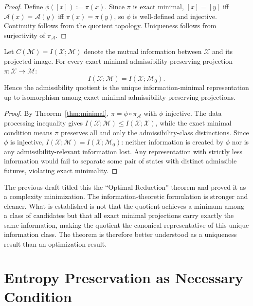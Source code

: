 \documentclass[12pt, a4paper, oneside]{book}
\newcommand{\Adm}{\mathcal{A}}
\newcommand{\X}{\mathcal{X}}
\newcommand{\M}{\mathcal{M}}
\newcommand{\proj}{\pi}
\newcommand{\projA}{\pi_{\!\Adm}}
\begin{document}
\begin{proof}
Define $\phi([x]) := \proj(x)$. Since $\proj$ is exact minimal, $[x] = [y]$
iff $\Adm(x) = \Adm(y)$ iff $\proj(x) = \proj(y)$, so $\phi$ is
well-defined and injective. Continuity follows from the quotient topology.
Uniqueness follows from surjectivity of $\projA$.
\end{proof}

\begin{theorem}
\label{thm:info-minimal}
Let $C(\M) = I(\X;\M)$ denote the mutual information between $\X$ and
its projected image. For every exact minimal admissibility-preserving
projection $\proj : \X \to \M$:
\[
  I(\X;\M) = I(\X;\M_0).
\]
Hence the admissibility quotient is the unique information-minimal
representation up to isomorphism among exact minimal
admissibility-preserving projections.
\end{theorem}

\begin{proof}
By Theorem~\ref{thm:minimal}, $\proj = \phi \circ \projA$ with $\phi$
injective. The data processing inequality gives $I(\X;\M) \leq I(\X;\X) $,
while the exact minimal condition means $\proj$ preserves all and only
the admissibility-class distinctions. Since $\phi$ is injective,
$I(\X;\M) = I(\X;\M_0)$: neither information is created by $\phi$ nor
is any admissibility-relevant information lost. Any representation with
strictly less information would fail to separate some pair of states
with distinct admissible futures, violating exact minimality.
\end{proof}

\begin{remark}
The previous draft titled this the ``Optimal Reduction'' theorem and
proved it as a complexity minimization. The information-theoretic
formulation is stronger and cleaner. What is established is not that the
quotient achieves a minimum among a class of candidates but that all
exact minimal projections carry exactly the same information, making the
quotient the canonical representative of this unique information class.
The theorem is therefore better understood as a uniqueness result than an
optimization result.
\end{remark}

\section{Entropy Preservation as Necessary Condition}
\end{document}
